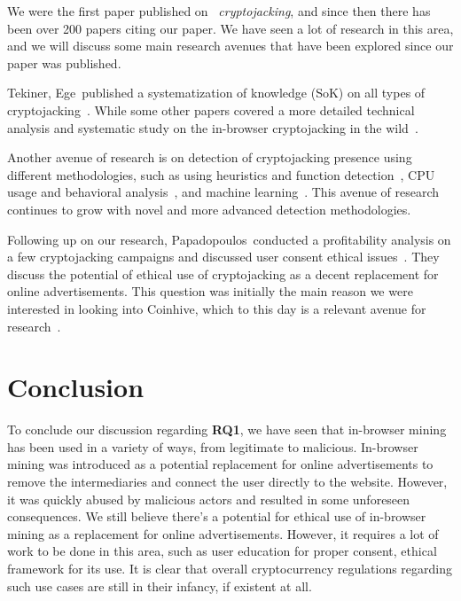 We were the first paper published on ~\textit{cryptojacking}, and since then there has been over 200 papers citing our paper. We have seen a lot of research in this area, and we will discuss some main research avenues that have been explored since our paper was published.

Tekiner, Ege~\etal published a systematization of knowledge (SoK) on all types of cryptojacking~\cite{tekiner2021sok}. While some other papers covered a more detailed technical analysis and systematic study on the in-browser cryptojacking in the wild~\cite{hong2018you,ruth2018digging,bijmans2019inadvertently,musch2019thieves,musch2018web,saad2018end}.

Another avenue of research is on detection of cryptojacking presence using different methodologies, such as using heuristics and function detection~\cite{kharraz2019outguard,konoth2018minesweeper}, CPU usage and behavioral analysis~\cite{gomes2020cryptojacking,ning2019capjack,rodriguez2018rapid,tanana2020behavior}, and machine learning~\cite{naseem2021minos,caprolu2021cryptomining,liu2018novel,petrov2020coinpolice}. This avenue of research continues to grow with novel and more advanced detection methodologies.

Following up on our research, Papadopoulos~\etal conducted a profitability analysis on a few cryptojacking campaigns and discussed user consent ethical issues~\cite{papadopoulos2018truth}. They discuss the potential of ethical use of cryptojacking as a decent replacement for online advertisements. This question was initially the main reason we were interested in looking into Coinhive, which to this day is a relevant avenue for research~\cite{yayla2023mining}.



\section{Conclusion}
To conclude our discussion regarding \textbf{RQ1}, we have seen that in-browser mining has been used in a variety of ways, from legitimate to malicious. In-browser mining was introduced as a potential replacement for online advertisements to remove the intermediaries and connect the user directly to the website. However, it was quickly abused by malicious actors and resulted in some unforeseen consequences. We still believe there's a potential for ethical use of in-browser mining as a replacement for online advertisements. However, it requires a lot of work to be done in this area, such as user education for proper consent, ethical framework for its use. It is clear that overall cryptocurrency regulations regarding such use cases are still in their infancy, if existent at all. 




